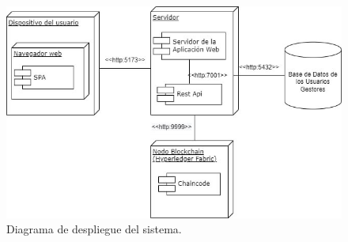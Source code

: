 \begin{figure}[h]
	\centering
	\includegraphics[width=\linewidth]{Graphics/diagrama.png}
	\caption{Diagrama de despliegue del sistema.}
	\label{fig:10}
\end{figure}

